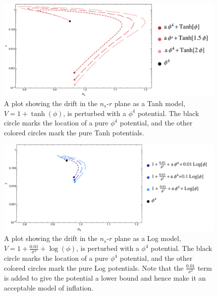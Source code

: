 \documentclass[a4paper,11pt]{article}
\def\nsr{$n_s$-$r$ }
\begin{document}
\newpage
\begin{minipage}[t][0.5\textheight][t]{\textwidth}
\begin{figure}[H]
	\centering
	\includegraphics[width=\textwidth]{figures/LFP_lines_Tanh_final.pdf}
	\caption[Drift in \nsr plane for Tanh model with perturbations.]{A plot showing the drift in the \nsr plane as a Tanh model, $V=1+\tanh(\phi)$, is perturbed with a $\phi^4$ potential. The black circle marks the location of a pure $\phi^4$ potential, and the other colored circles mark the pure Tanh potentials.}
	\label{fig:LFP_Tanh_drift}
\end{figure}
\end{minipage}
\begin{minipage}[t][0.5\textheight][t]{\textwidth}
\begin{figure}[H]
	\centering
	\includegraphics[width=\textwidth]{figures/LFP_lines_Log_final.pdf}
	\caption[Drift in \nsr plane for Log model with perturbations.]{A plot showing the drift in the \nsr plane as a Log model, $V=1+\tfrac{0.01}{x^2}+\log(\phi)$, is perturbed with a $\phi^4$ potential. The black circle marks the location of a pure $\phi^4$ potential, and the other colored circles mark the pure Log potentials. Note that the $\tfrac{0.01}{x^2}$ term is added to give the potential a lower bound and hence make it an acceptable model of inflation.}
	\label{fig:LFP_Log_drift}
\end{figure}
\end{minipage}
\newpage
\end{document}
